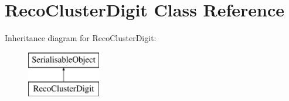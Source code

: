 \hypertarget{classRecoClusterDigit}{\section{Reco\-Cluster\-Digit Class Reference}
\label{classRecoClusterDigit}
}
Inheritance diagram for Reco\-Cluster\-Digit\-:\begin{figure}[H]
\begin{center}
\leavevmode
\includegraphics[height=2.000000cm]{classRecoClusterDigit}
\end{center}
\end{figure}
